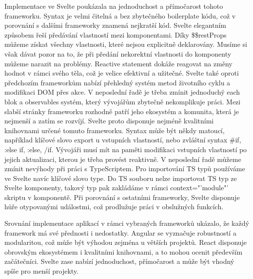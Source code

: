 Implementace ve Svelte poukázala na jednoduchost a přímočarost tohoto frameworku. 
Syntax je velmi čitelná a bez zbytečného boilerplate kódu, což v porovnání s dalšími frameworky znamená nejkratší kód. 
Svelte elegantním způsobem řeší předávání vlastností mezi komponentami. 
Díky \$\$restProps můžeme získat všechny vlastnosti, které nejsou explicitně deklarovány. 
Musíme si však dávat pozor na to, že při předání nekorektní vlastnosti do komponenty můžeme narazit na problémy. 
Reactive statement dokáže reagovat na změny hodnot v rámci svého těla, což je velice efektivní a užitečné. 
Svelte také oproti předchozím frameworkům nabízí přehledný systém metod životního cyklu a modifikaci DOM přes akce. 
V neposlední řadě je třeba zmínit jednoduchý each blok a observables systém, který vývojářům zbytečně nekomplikuje práci.
Mezi slabší stránky frameworku rozhodně patří jeho ekosystém a komunita, která je nejmenší a zatím se rozvíjí. 
Svelte proto disponuje nejméně kvalitními knihovnami určené tomuto frameworku. 
Syntax může být někdy matoucí, například klíčové slovo export u vstupních vlastností, nebo zvláštní syntax \#if, :else if, :else, /if. 
Vývojáři musí mít na paměti modifikaci vstupních vlastností po jejich aktualizaci, kterou je třeba provést reaktivně. 
V neposlední řadě můžeme zmínit nevýhody při práci s TypeScriptem. Pro importování TS typů používáme ve Svelte navíc klíčové slovo type. 
Do TS souboru nelze importovat TS typ ze Svelte komponenty, takový typ pak zakládáme v rámci context="'module"' skriptu v komponentě.
Při porovnání s ostatními frameworky, Svelte disponuje hůře otypovanými událostmi, což prodlužuje práci v obslužných funkcích.


Srovnání implementace aplikací v rámci vybraných frameworků ukázalo, že každý framework má své přednosti i nedostatky. 
Angular se vyznačuje robustností a modularitou, což může být výhodou zejména u větších projektů. 
React disponuje obrovským ekosystémem i kvalitními knihovnami, a to mohou ocenit především začátečníci. 
Svelte zase nabízí jednoduchost, přímočarost a může být vhodný spíše pro menší projekty.